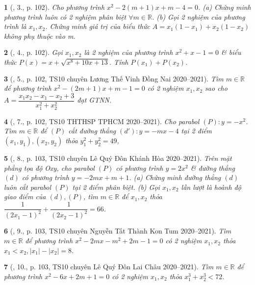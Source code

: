 \documentclass{article}
\newtheorem{baitoan}{}
\begin{document}
\begin{baitoan}[\cite{Thu_Viet_Minh_ptb2}, 3., p. 102]
	Cho phương trình $x^2 - 2(m + 1)x + m - 4 = 0$. (a) Chứng minh phương trình luôn có 2 nghiệm phân biệt $\forall m\in\mathbb{R}$. (b) Gọi 2 nghiệm của phương trình là $x_1,x_2$. Chứng minh giá trị của biểu thức $A= x_1(1 - x_1) + x_2(1 - x_2)$ không phụ thuộc vào m.
\end{baitoan}

\begin{baitoan}[\cite{Thu_Viet_Minh_ptb2}, 4., p. 102]
	Gọi $x_1,x_2$ là 2 nghiệm của phương trình $x^2 + x - 1 = 0$ \& biểu thức $P(x) = x +  \sqrt{x^8 + 10x + 13}$. Tính $P(x_1) + P(x_2)$.
\end{baitoan}

\begin{baitoan}[\cite{Thu_Viet_Minh_ptb2}, 5., p. 102, TS10 chuyên Lương Thế Vinh Đồng Nai 2020--2021]
	Tìm $m\in\mathbb{R}$ để phương trình $x^2 - (2m + 1)x + m - 1 = 0$ có 2 nghiệm $x_1,x_2$ sao cho $A = \dfrac{x_1x_2 - x_1 - x_2 + 3}{x_1^2 + x_2^2}$ đạt {\rm GTNN}.
\end{baitoan}

\begin{baitoan}[\cite{Thu_Viet_Minh_ptb2}, 7., p. 102, TS10 THTHSP TPHCM 2020--2021]
	Cho parabol $(P):y = -x^2$. Tìm $m\in\mathbb{R}$ để $(P)$ cắt đường thẳng $(d'):y = -mx - 4$ tại 2 điểm $(x_1,y_1),(x_2,y_2)$ thỏa $y_1^2 + y_2^2 = 49$,
\end{baitoan}

\begin{baitoan}[\cite{Thu_Viet_Minh_ptb2}, 8., p. 103, TS10 chuyên Lê Quý Đôn Khánh Hòa 2020--2021]
	Trên mặt phẳng tọa độ Oxy, cho parabol $(P)$ có phương trình $y = 2x^2$ \& đường thẳng $(d)$ có phương trình $y = -2mx + m + 1$. (a) Chứng minh đường thẳng $(d)$ luôn cắt parabol $(P)$ tại 2 điểm phân biệt. (b) Gọi $x_1,x_2$ lần lượt là hoành độ giao điểm của $(d),(P)$, tìm $m\in\mathbb{R}$ để $x_1,x_2$ thỏa $\dfrac{1}{(2x_1 - 1)^2} + \dfrac{1}{(2x_2 - 1)^2} = 66$.
\end{baitoan}

\begin{baitoan}[\cite{Thu_Viet_Minh_ptb2}, 9., p. 103, TS10 chuyên Nguyễn Tất Thành Kon Tum 2020--2021]
	Tìm $m\in\mathbb{R}$ để phương trình $x^2 - 2mx - m^2 + 2m - 1 = 0$ có 2 nghiệm $x_1,x_2$ thỏa $x_1 < x_2,|x_1| - |x_2| = 8$.
\end{baitoan}

\begin{baitoan}[\cite{Thu_Viet_Minh_ptb2}, 10., p. 103, TS10 chuyên Lê Quý Đôn Lai Châu 2020--2021]
	Tìm $m\in\mathbb{R}$ để phương trình $x^2 - 6x + 2m + 1 = 0$ có 2 nghiệm $x_1,x_2$ thỏa $x_1^3 + x_2^3 < 72$.
\end{baitoan}
\end{document}
